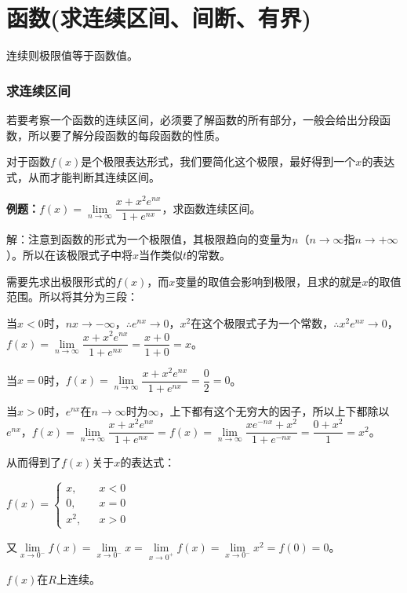 \section{函数(求连续区间、间断、有界)}



连续则极限值等于函数值。

\subsubsection{求连续区间}

若要考察一个函数的连续区间，必须要了解函数的所有部分，一般会给出分段函数，所以要了解分段函数的每段函数的性质。

对于函数$f(x)$是个极限表达形式，我们要简化这个极限，最好得到一个$x$的表达式，从而才能判断其连续区间。\medskip

\textbf{例题：}$f(x)=\lim\limits_{n\to\infty}\dfrac{x+x^2e^{nx}}{1+e^{nx}}$，求函数连续区间。\medskip

解：注意到函数的形式为一个极限值，其极限趋向的变量为$n$（$n\to\infty$指$n\to+\infty$）。所以在该极限式子中将$x$当作类似$t$的常数。

需要先求出极限形式的$f(x)$，而$x$变量的取值会影响到极限，且求的就是$x$的取值范围。所以将其分为三段：

当$x<0$时，$nx\to-\infty$，$\therefore e^{nx}\to 0$，$x^2$在这个极限式子为一个常数，$\therefore x^2e^{nx}\to 0$，$f(x)=\lim\limits_{n\to\infty}\dfrac{x+x^2e^{nx}}{1+e^{nx}}=\dfrac{x+0}{1+0}=x$。\medskip

当$x=0$时，$f(x)=\lim\limits_{n\to\infty}\dfrac{x+x^2e^{nx}}{1+e^{nx}}=\dfrac{0}{2}=0$。\medskip

当$x>0$时，$e^{nx}$在$n\to\infty$时为$\infty$，上下都有这个无穷大的因子，所以上下都除以$e^{nx}$，$f(x)=\lim\limits_{n\to\infty}\dfrac{x+x^2e^{nx}}{1+e^{nx}}=f(x)=\lim\limits_{n\to\infty}\dfrac{xe^{-nx}+x^2}{1+e^{-nx}}=\dfrac{0+x^2}{1}=x^2$。\medskip

从而得到了$f(x)$关于$x$的表达式：\medskip

$f(x)=\left\{\begin{array}{lcl}
        x,   &  & x<0 \\
        0,   &  & x=0 \\
        x^2, &  & x>0
    \end{array}
    \right.$\medskip

又$\lim\limits_{x\to 0^-}f(x)=\lim\limits_{x\to 0^-}x=\lim\limits_{x\to 0^+}f(x)=\lim\limits_{x\to 0^-}x^2=f(0)=0$。

$f(x)$在$R$上连续。

